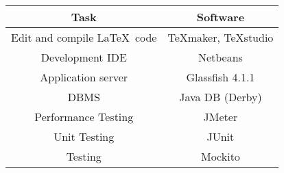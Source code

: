 \begin{center}
	
	\-\\
	\begin{tabular}{*{2}{c}}
		\toprule
		Task & Software \\
		\midrule
		Edit and compile \LaTeX\ code & TeXmaker, TeXstudio\\
		Development IDE & Netbeans\\
		Application server & Glassfish 4.1.1\\
		DBMS & Java DB (Derby)\\
		Performance Testing & JMeter\\
		Unit Testing & JUnit\\
		Testing & Mockito\\
		\bottomrule
	\end{tabular}
\end{center}